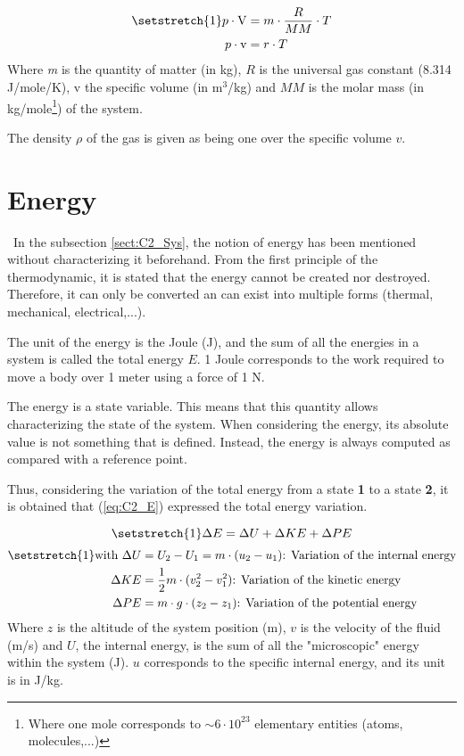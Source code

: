 \begin{align}
\setstretch{1}
p\cdot \mathrm{V} &= m\cdot\frac{R}{MM}\cdot T\nonumber\\
p\cdot \mathrm{v} &= r\cdot T\label{eq:C2_GP}    
\end{align}
Where \textit{m} is the quantity of matter (in kg), $R$ is the universal gas constant (8.314 J/mole/K), $\mathrm{v}$ the specific volume (in m$^3$/kg) and $MM$ is the molar mass (in kg/mole\footnote{Where one mole corresponds to $\sim 6\cdot 10^{23}$ elementary entities (atoms, molecules,...)}) of the system. 

The density $\rho$ of the gas is given as being one over the specific volume $v$.
\section{Energy}\label{sect:C2_Ener}
\quad\, In the subsection \ref{sect:C2_Sys}, the notion of energy has been mentioned without characterizing it beforehand. From the first principle of the thermodynamic, it is stated that the energy cannot be created nor destroyed. Therefore, it can only be converted an can exist into multiple forms (thermal, mechanical, electrical,...)\cite{thermoApp_2}. 

The unit of the energy is the Joule (J), and the sum of all the energies in a system is called the total energy $E$. 1 Joule corresponds to the work required to move a body over 1 meter using a force of 1 N.

The energy is a state variable. This means that this quantity allows characterizing the state of the system. When considering the energy, its absolute value is not something that is defined. Instead, the energy is always computed as compared with a reference point.

Thus, considering the variation of the total energy from a state \textbf{1} to a state \textbf{2}, it is obtained that (\ref{eq:C2_E}) expressed the total energy variation.

\begin{equation}
\setstretch{1}
    \Delta E = \Delta U + \Delta KE + \Delta PE \label{eq:C2_E}
\end{equation}
\begin{align*}
\setstretch{1}
    \text{with } \Delta U  &= U_2 - U_1 =  m\cdot(u_2 - u_1) \text{: Variation of the internal energy}\\
                 \Delta KE &= \frac{1}{2}m\cdot(v^2_2 - v^2_1)\text{: Variation of the kinetic energy}\\
                 \Delta PE &= m\cdot g\cdot(z_2 - z_1)\text{: Variation of the potential energy}
\end{align*} 
Where $z$ is the altitude of the system position (m), $v$ is the velocity of the fluid (m/s) and $U$, the internal energy, is the sum of all the "microscopic" energy within the system (J). $u$ corresponds to the specific internal energy, and its unit is in J/kg.

